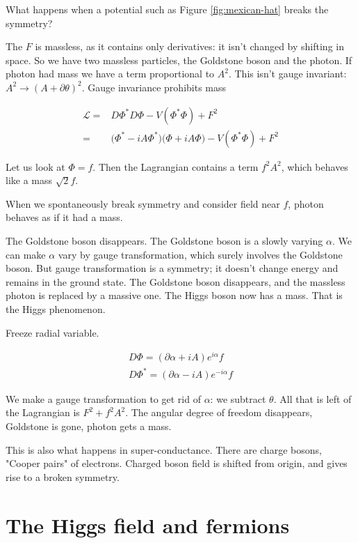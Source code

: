 \documentclass[]{article}
\begin{document}
What happens when a potential such as Figure \ref{fig:mexican-hat} breaks the symmetry?

The $F$ is massless, as it contains only derivatives: it isn't changed by shifting in space. So we have two massless particles, the Goldstone boson and the photon. If photon had mass we have a term proportional to $A^2$. This isn't gauge invariant: $A^2 \rightarrow (A+\partial \theta)^2$. Gauge invariance prohibits mass

\begin{align*}
	\mathcal{L} =& D\Phi^* D\Phi -V(\Phi^*\Phi) +F^2\\
	=& \big( \Phi^* - i A \Phi^*\big) \big( \Phi + i A \Phi\big) -V(\Phi^*\Phi) +F^2
\end{align*}

Let us look at $\Phi = f$. Then the Lagrangian contains a term $f^2A^2$, which behaves like a mass $\sqrt{2}f$.

When we spontaneously break symmetry and consider field near $f$, photon behaves as if it had a mass.

The Goldstone boson disappears. The Goldstone boson is a slowly varying $\alpha$. We can make $\alpha$ vary by gauge transformation, which surely involves the Goldstone boson. But gauge transformation is a symmetry; it doesn't change energy and remains in the ground state. The Goldstone boson disappears, and the massless photon is replaced by a massive one. The Higgs boson now has a mass. That is the Higgs phenomenon.


Freeze radial variable.

\begin{align*}
	D \Phi = (\partial \alpha + iA)e^{i\alpha}f\\
	D \Phi^* = (\partial \alpha - iA)e^{-i\alpha}f
\end{align*}

We make a gauge transformation to get rid of $\alpha$: we subtract $\theta$. All that is left of the Lagrangian is $F^2+f^2A^2$. The angular degree of freedom disappears, Goldstone is gone, photon gets a mass.

This is also what happens in super-conductance. There are charge bosons, "Cooper pairs" of electrons. Charged boson field is shifted from origin, and gives rise to a broken symmetry.


\section{The Higgs field and fermions}
\end{document}
